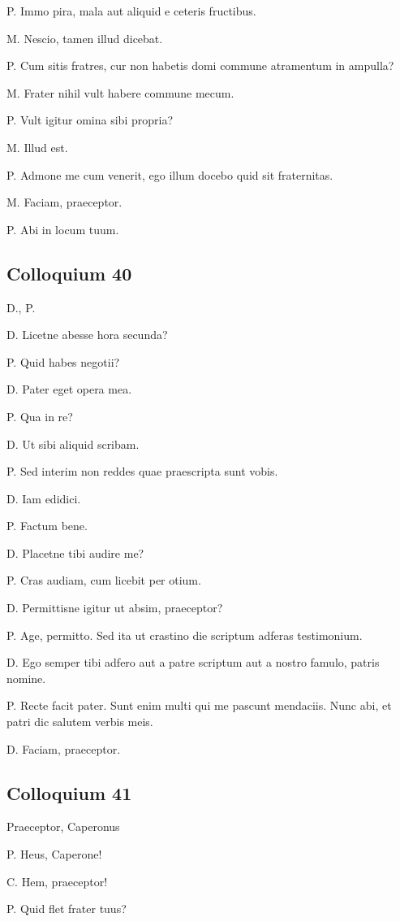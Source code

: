 \documentclass{article}
\begin{document}
P. Immo pira, mala aut aliquid e ceteris fructibus.

M. Nescio, tamen illud dicebat.

P. Cum sitis fratres, cur non habetis domi commune atramentum in ampulla?

M. Frater nihil vult habere commune mecum.

P. Vult igitur omina sibi propria?

M. Illud est.

P. Admone me cum venerit, ego illum docebo quid sit fraternitas.

M. Faciam, praeceptor.

P. Abi in locum tuum.

\subsection{Colloquium 40}
D., P.

D. Licetne abesse hora secunda?

P. Quid habes negotii?

D. Pater eget opera mea.

P. Qua in re?

D. Ut sibi aliquid scribam.

P. Sed interim non reddes quae praescripta sunt vobis.

D. Iam edidici.

P. Factum bene.

D. Placetne tibi audire me?

P. Cras audiam, cum licebit per otium.

D. Permittisne igitur ut absim, praeceptor?

P. Age, permitto. Sed ita ut crastino die scriptum adferas testimonium.

D. Ego semper tibi adfero aut a patre scriptum aut a nostro famulo, patris nomine.

P. Recte facit pater. Sunt enim multi qui me pascunt mendaciis. Nunc abi, et patri dic salutem verbis meis.

D. Faciam, praeceptor.

\subsection{Colloquium 41}
Praeceptor, Caperonus

P. Heus, Caperone!

C. Hem, praeceptor!

P. Quid flet frater tuus?
\end{document}
